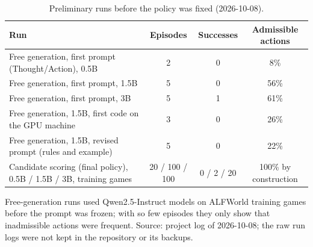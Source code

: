 \begin{table}[htbp]
\centering\small
\caption{Preliminary runs before the policy was fixed (2026-10-08).}\label{tab:a5}
\begin{tabularx}{\linewidth}{@{}Lccc@{}}
\toprule
Run & Episodes & Successes & Admissible actions \\
\midrule
Free generation, first prompt (Thought/Action), 0.5B & 2 & 0 & 8\% \\
Free generation, first prompt, 1.5B & 5 & 0 & 56\% \\
Free generation, first prompt, 3B & 5 & 1 & 61\% \\
Free generation, 1.5B, first code on the GPU machine & 3 & 0 & 26\% \\
Free generation, 1.5B, revised prompt (rules and example) & 5 & 0 & 22\% \\
Candidate scoring (final policy), 0.5B / 1.5B / 3B, training games & 20 / 100 / 100 & 0 / 2 / 20 & 100\% by construction \\
\bottomrule
\end{tabularx}
\par\smallskip\raggedright\footnotesize
Free-generation runs used Qwen2.5-Instruct models on ALFWorld training games before the prompt was frozen; with so few episodes they only show that inadmissible actions were frequent. Source: project log of 2026-10-08; the raw run logs were not kept in the repository or its backups.
\end{table}
